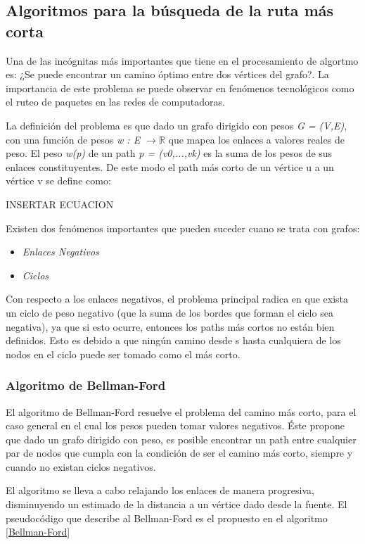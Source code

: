 \documentclass[a4paper, 11pt]{report}
\begin{document}
\subsection{Algoritmos para la b\'usqueda de la ruta m\'as corta}
Una de las inc\'ognitas m\'as importantes que tiene en el procesamiento de algortmo es: ¿Se puede encontrar un camino \'optimo entre dos v\'ertices del grafo?. La importancia de este problema se puede observar en fen\'omenos tecnol\'ogicos como el ruteo de paquetes en las redes de computadoras. 

La definici\'on del problema es que dado un grafo dirigido con pesos \textit{G = (V,E)}, con una funci\'on de pesos \textit{w : E $\longrightarrow \mathbb{R}$} que mapea los enlaces a valores reales de peso. El peso \textit{w(p)} de un path \textit{p = (v0,...,vk)} es la suma de los pesos de sus enlaces constituyentes. De este modo el path m\'as corto de un v\'ertice u a un v\'ertice v se define como:

INSERTAR ECUACION

Existen dos fen\'omenos importantes que pueden suceder cuano se trata con grafos:
\begin{itemize}
    \item \textit{Enlaces Negativos}
    \item \textit{Ciclos}
\end{itemize}

Con respecto a los enlaces negativos, el problema principal radica en que exista un ciclo de peso negativo (que la suma de los bordes que forman el ciclo sea negativa), ya que si esto ocurre, entonces los paths m\'as cortos no est\'an bien definidos. Esto es debido a que ning\'un camino desde s hasta cualquiera de los nodos en el ciclo puede ser tomado como el m\'as corto.

\subsubsection{Algoritmo de Bellman-Ford}
El algoritmo de Bellman-Ford resuelve el problema del camino m\'as corto, para el caso general en el cual los pesos pueden tomar valores negativos. \'Este propone que dado un grafo dirigido con peso, es posible encontrar un path entre cualquier par de nodos que cumpla con la condici\'on de ser el camino m\'as corto, siempre y cuando no existan ciclos negativos.

El algoritmo se lleva a cabo relajando los enlaces de manera progresiva, disminuyendo un estimado de la distancia a un v\'ertice dado desde la fuente. El pseudoc\'odigo que describe al Bellman-Ford es el propuesto en el algoritmo \ref{Bellman-Ford}
\end{document}
